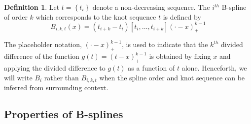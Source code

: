 \documentclass[12pt]{article}
\theoremstyle{definition}
\newtheorem{definition}{Definition}[section]
\begin{document}
\begin{definition} \label{definition:order_k_Bspline}
Let $t= \left\{ t_i \right\}$ denote a non-decreasing sequence. The $i^{th}$ B-spline of order $k$ which corresponds to the knot sequence $t$ is defined by 
\begin{equation} \label{eq:bspline_definition}
B_{i,k,t}\left(x\right) = \left(t_{i+k}-t_i\right)\left[t_i,\dots,t_{i+k}\right]\left(\cdot -x\right)_+^{k-1}
\end{equation}
\end{definition}

The placeholder notation, $\left(\cdot - x\right)_+^{k-1}$, is used to indicate that the $k^{th}$ divided difference of the function $g\left(t \right) = \left(t-x\right)^{k-1}_+$ is obtained by fixing $x$ and applying the divided difference to $g\left(t \right)$ as a function of $t$ alone. Henceforth, we will write $B_i$ rather than $B_{i,k,t}$ when the spline order and knot sequence can be inferred from surrounding context.

\subsection{Properties of B-splines}
\end{document}
